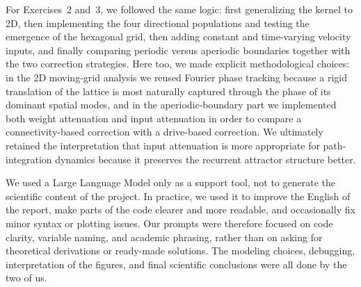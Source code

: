 \documentclass[10pt, a4paper]{article}
\begin{document}
For Exercises~2 and~3, we followed the same logic: first generalizing the kernel to 2D, then implementing the four directional populations and testing the emergence of the hexagonal grid, then adding constant and time-varying velocity inputs, and finally comparing periodic versus aperiodic boundaries together with the two correction strategies. Here too, we made explicit methodological choices: in the 2D moving-grid analysis we reused Fourier phase tracking because a rigid translation of the lattice is most naturally captured through the phase of its dominant spatial modes, and in the aperiodic-boundary part we implemented both weight attenuation and input attenuation in order to compare a connectivity-based correction with a drive-based correction. We ultimately retained the interpretation that input attenuation is more appropriate for path-integration dynamics because it preserves the recurrent attractor structure better.

We used a Large Language Model only as a support tool, not to generate the scientific content of the project. In practice, we used it to improve the English of the report, make parts of the code clearer and more readable, and occasionally fix minor syntax or plotting issues. Our prompts were therefore focused on code clarity, variable naming, and academic phrasing, rather than on asking for theoretical derivations or ready-made solutions. The modeling choices, debugging, interpretation of the figures, and final scientific conclusions were all done by the two of us.

\newpage


\end{document}
